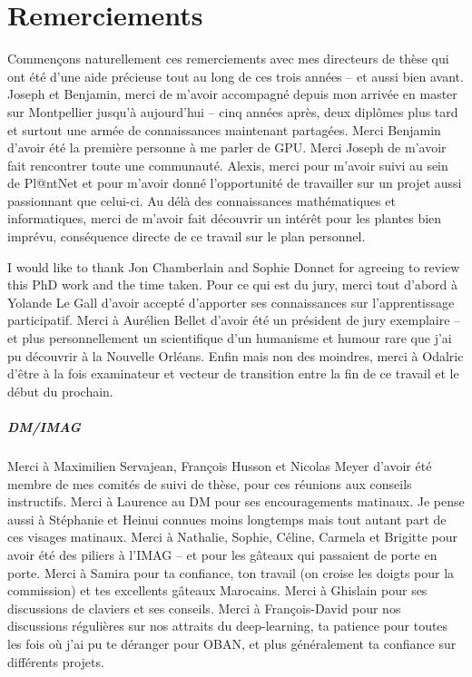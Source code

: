 \chapter{Remerciements}


Commençons naturellement ces remerciements avec mes directeurs de thèse qui ont été d'une aide précieuse tout au long de ces trois années -- et aussi bien avant.
Joseph et Benjamin, merci de m'avoir accompagné depuis mon arrivée en master sur Montpellier jusqu'à aujourd'hui -- cinq années après, deux diplômes plus tard et surtout une armée de connaissances maintenant partagées.
Merci Benjamin d'avoir été la première personne à me parler de GPU.
Merci Joseph de m'avoir fait rencontrer toute une communauté.
Alexis, merci pour m'avoir suivi au sein de Pl@ntNet et pour m'avoir donné l'opportunité de travailler sur un projet aussi passionnant que celui-ci.
Au délà des connaissances mathématiques et informatiques, merci de m'avoir fait découvrir un intérêt pour les plantes bien imprévu, conséquence directe de ce travail sur le plan personnel.

\medskip

I would like to thank Jon Chamberlain and Sophie Donnet for agreeing to review this PhD work and the time taken.
Pour ce qui est du jury, merci tout d'abord à Yolande Le Gall d'avoir accepté d'apporter ses connaissances sur l'apprentissage participatif. Merci à Aurélien Bellet d'avoir été un président de jury exemplaire -- et plus personnellement un scientifique d'un humanisme et humour rare que j'ai pu découvrir à la Nouvelle Orléans. Enfin mais non des moindres, merci à Odalric d'être à la fois examinateur et vecteur de transition entre la fin de ce travail et le début du prochain.

\medskip

\paragraph*{DM/IMAG}
Merci à Maximilien Servajean, François Husson et Nicolas Meyer d'avoir été membre de mes comités de suivi de thèse, pour ces réunions aux conseils instructifs.
Merci à Laurence au DM pour ses encouragements matinaux. Je pense aussi à Stéphanie et Heinui connues moins longtemps mais tout autant part de ces visages matinaux.
Merci à Nathalie, Sophie, Céline, Carmela et Brigitte pour avoir été des piliers à l'IMAG -- et pour les gâteaux qui passaient de porte en porte.
Merci à Samira pour ta confiance, ton travail (on croise les doigts pour la commission) et tes excellents gâteaux Marocains.
Merci à Ghislain pour ses discussions de claviers et ses conseils.
Merci à François-David pour nos discussions régulières sur nos attraits du deep-learning, ta patience pour toutes les fois où j'ai pu te déranger pour OBAN, et plus généralement ta confiance sur différents projets.
\medskip

